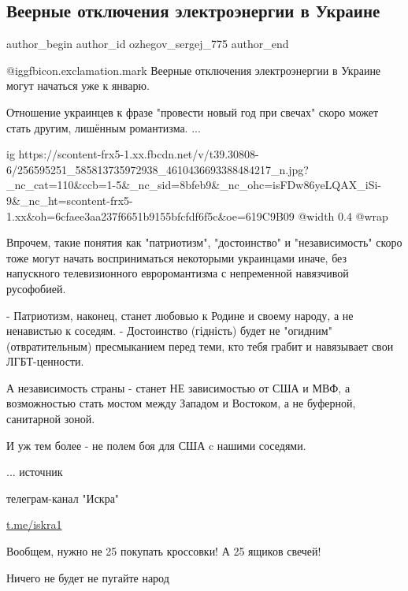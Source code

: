  
 
 
 
 
 
\subsection{Веерные отключения электроэнергии в Украине}
\label{sec:12_11_2021.fb.ozhegov_sergej_775.1.vejer_otkluchenia}
 
\ifcmt
 author_begin
   author_id ozhegov_sergej_775
 author_end
\fi

@igg{fbicon.exclamation.mark} Веерные отключения электроэнергии в Украине могут начаться уже к январю.

Отношение украинцев к фразе "провести новый год при свечах" скоро может стать
другим, лишённым романтизма.  ...

\ifcmt
  ig https://scontent-frx5-1.xx.fbcdn.net/v/t39.30808-6/256595251_585813735972938_4610436693388484217_n.jpg?_nc_cat=110&ccb=1-5&_nc_sid=8bfeb9&_nc_ohc=isFDw86yeLQAX_iSi-9&_nc_ht=scontent-frx5-1.xx&oh=6cfaee3aa237f6651b9155bfcfdf6f5c&oe=619C9B09
  @width 0.4
  @wrap 
\fi

Впрочем, такие понятия как "патриотизм", "достоинство" и "независимость" скоро
тоже могут начать восприниматься некоторыми украинцами иначе,  без напускного
телевизионного евроромантизма с непременной навязчивой русофобией.

- Патриотизм, наконец, станет любовью к Родине и своему народу, а не ненавистью к соседям. 
- Достоинство (гідність) будет не "огидним" (отвратительным) пресмыканием перед теми, кто тебя грабит и навязывает свои ЛГБТ-ценности.

А независимость страны - станет НЕ зависимостью от США и МВФ, а возможностью
стать мостом между Западом и Востоком, а не буферной, санитарной зоной. 

И уж тем более - не полем боя для США c нашими соседями.

...
источник

телеграм-канал "Искра"

\url{t.me/iskra1}

\begin{itemize} %
Вообщем, нужно не 25 покупать кроссовки!
А 25 ящиков свечей!

Ничего не будет не пугайте народ
\end{itemize} %
